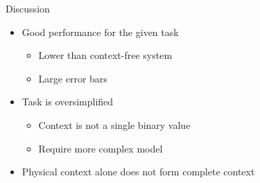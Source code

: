 \documentclass[handout,11pt]{beamer}
\begin{document}
	\begin{frame}{Discussion}
		\begin{itemize}
			\item Good performance for the given task
				\begin{itemize}
					\item Lower than context-free system
					\item Large error bars
				\end{itemize}
			\item Task is oversimplified
				\begin{itemize}
					\item Context is not a single binary value
					\item Require more complex model
				\end{itemize}
			\item Physical context alone does not form complete context
		\end{itemize}
	\end{frame}
\end{document}
